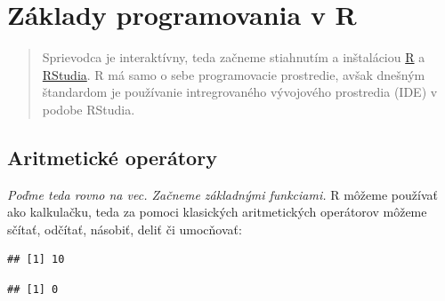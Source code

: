 \newpage

\hypertarget{zuxe1klady-programovania-v-r}{%
\section{Základy programovania v R}\label{zuxe1klady-programovania-v-r}}

\begin{quote}
Sprievodca je interaktívny, teda začneme stiahnutím a inštaláciou
\href{https://cran.r-project.org/mirrors.html}{R} a
\href{https://cran.r-project.org/mirrors.html}{RStudia}. R má samo o
sebe programovacie prostredie, avšak dnešným štandardom je používanie
intregrovaného vývojového prostredia (IDE) v podobe RStudia.
\end{quote}

\hypertarget{aritmetickuxe9-operuxe1tory}{%
\subsection{Aritmetické operátory}\label{aritmetickuxe9-operuxe1tory}}

\emph{Poďme teda rovno na vec. Začneme základnými funkciami.} R môžeme
používať ako kalkulačku, teda za pomoci klasických aritmetických
operátorov môžeme sčítať, odčítať, násobiť, deliť či umocňovať:

\begin{Shaded}
\begin{Highlighting}[]
 \OperatorTok{+}\StringTok{ }
\end{Highlighting}
\end{Shaded}

\begin{verbatim}
## [1] 10
\end{verbatim}

\begin{Shaded}
\begin{Highlighting}[]
 \OperatorTok{-}\StringTok{ }
\end{Highlighting}
\end{Shaded}

\begin{verbatim}
## [1] 0
\end{verbatim}

\begin{Shaded}
\begin{Highlighting}[]
 \OperatorTok{*}\StringTok{ }
\end{Highlighting}
\end{Shaded}

